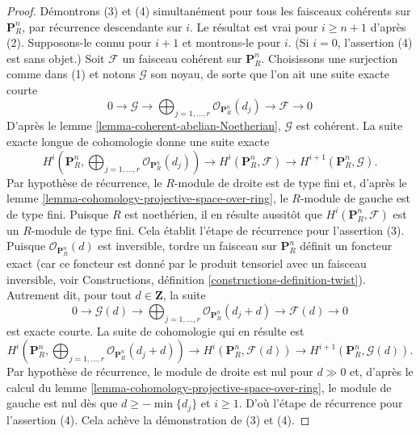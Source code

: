 \begin{proof}
\medskip\noindent
Démontrons (3) et (4) simultanément pour tous les faisceaux cohérents
sur $\mathbf{P}^n_R$, par récurrence descendante sur $i$. Le résultat est
vrai pour $i \geq n + 1$ d'après (2). Supposons-le connu pour
$i + 1$ et montrons-le pour $i$. (Si $i = 0$, l'assertion
(4) est sans objet.) Soit $\mathcal{F}$ un faisceau cohérent sur
$\mathbf{P}^n_R$. Choisissons une surjection comme dans (1) et notons
$\mathcal{G}$ son noyau, de sorte que l'on ait une suite exacte courte
$$
0 \to \mathcal{G} \to
\bigoplus\nolimits_{j = 1, \ldots, r}
\mathcal{O}_{\mathbf{P}^n_R}(d_j)
\to
\mathcal{F} \to 0
$$
D'après le lemme \ref{lemma-coherent-abelian-Noetherian},
$\mathcal{G}$ est cohérent. La suite exacte
longue de cohomologie donne une suite exacte
$$
H^i(\mathbf{P}^n_R, \bigoplus\nolimits_{j = 1, \ldots, r}
\mathcal{O}_{\mathbf{P}^n_R}(d_j))
\to
H^i(\mathbf{P}^n_R, \mathcal{F})
\to
H^{i + 1}(\mathbf{P}^n_R, \mathcal{G}).
$$
Par hypothèse de récurrence, le $R$-module de droite est de type fini et, d'après
le lemme \ref{lemma-cohomology-projective-space-over-ring}, le
$R$-module de gauche est de type fini. Puisque $R$ est noethérien, il en résulte aussitôt
que $H^i(\mathbf{P}^n_R, \mathcal{F})$ est un $R$-module
de type fini. Cela établit l'étape de récurrence pour l'assertion (3).
Puisque $\mathcal{O}_{\mathbf{P}^n_R}(d)$ est
inversible, tordre un faisceau sur $\mathbf{P}^n_R$ définit un foncteur exact (car
ce foncteur est donné par le produit tensoriel avec un faisceau inversible, voir
Constructions, définition \ref{constructions-definition-twist}).
Autrement dit, pour tout $d \in \mathbf{Z}$, la suite
$$
0 \to \mathcal{G}(d) \to
\bigoplus\nolimits_{j = 1, \ldots, r}
\mathcal{O}_{\mathbf{P}^n_R}(d_j + d)
\to
\mathcal{F}(d) \to 0
$$
est exacte courte. La suite de cohomologie qui en résulte est
$$
H^i(\mathbf{P}^n_R, \bigoplus\nolimits_{j = 1, \ldots, r}
\mathcal{O}_{\mathbf{P}^n_R}(d_j + d))
\to
H^i(\mathbf{P}^n_R, \mathcal{F}(d))
\to
H^{i + 1}(\mathbf{P}^n_R, \mathcal{G}(d)).
$$
Par hypothèse de récurrence, le module de droite est nul
pour $d \gg 0$ et, d'après le calcul du
lemme \ref{lemma-cohomology-projective-space-over-ring},
le module de gauche est nul dès que $d \geq -\min\{d_j\}$
et $i \geq 1$. D'où l'étape de récurrence pour l'assertion (4).
Cela achève la démonstration de (3) et (4).


\end{proof}
